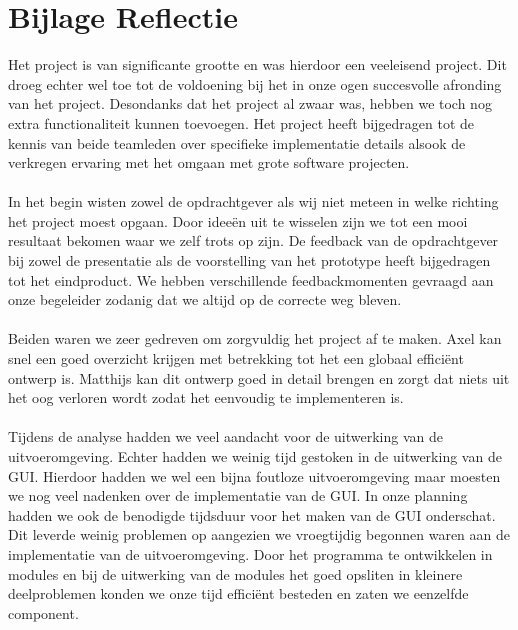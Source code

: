 \documentclass[]{article}
\begin{document}
\section{Bijlage Reflectie }
Het project is van significante grootte en was hierdoor een veeleisend project. Dit droeg echter wel toe tot de voldoening bij het in onze ogen succesvolle afronding van het project. Desondanks dat het project al zwaar was, hebben we toch nog extra functionaliteit kunnen toevoegen. Het project heeft bijgedragen tot de kennis van beide teamleden over specifieke implementatie details alsook de verkregen ervaring met het omgaan met grote software projecten. \\\\
In het begin wisten zowel de opdrachtgever als wij niet meteen in welke richting het project moest opgaan. Door idee\"en uit te wisselen zijn we tot een mooi resultaat bekomen waar we zelf trots op zijn. De feedback van de opdrachtgever bij zowel de presentatie als de voorstelling van het prototype heeft bijgedragen tot het eindproduct. We hebben verschillende feedbackmomenten gevraagd aan onze begeleider zodanig dat we altijd op de correcte weg bleven. \\\\
Beiden waren we zeer gedreven om zorgvuldig het project af te maken. Axel kan snel een goed overzicht krijgen met betrekking tot het een globaal effici\"ent ontwerp is. Matthijs kan dit ontwerp goed in detail brengen en zorgt dat niets uit het oog verloren wordt zodat het eenvoudig te implementeren is. \\\\
Tijdens de analyse hadden we veel aandacht voor de uitwerking van de uitvoeromgeving. Echter hadden we weinig tijd gestoken in de uitwerking van de GUI. Hierdoor hadden we wel een bijna foutloze uitvoeromgeving maar moesten we nog veel nadenken over de implementatie van de GUI. In onze planning hadden we ook de benodigde tijdsduur voor het maken van de GUI onderschat. Dit leverde weinig problemen op aangezien we vroegtijdig begonnen waren aan de implementatie van de uitvoeromgeving. Door het programma te ontwikkelen in modules en bij de uitwerking van de modules het goed opsliten in kleinere deelproblemen konden we onze tijd effici\"ent besteden en zaten we eenzelfde component.
\end{document}
